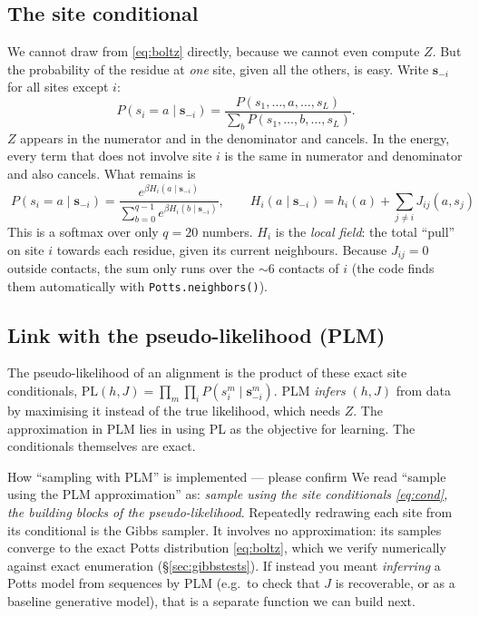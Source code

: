\documentclass[11pt,a4paper]{article}
\newcommand{\s}{\bm{s}}
\begin{document}
\subsection{The site conditional}
We cannot draw from \eqref{eq:boltz} directly, because we cannot even compute $Z$. But the probability
of the residue at \emph{one} site, given all the others, is easy. Write $\s_{-i}$ for all sites except $i$:
\[
P(s_i=a\mid\s_{-i}) = \frac{P(s_1,\dots,a,\dots,s_L)}{\sum_{b}P(s_1,\dots,b,\dots,s_L)}.
\]
$Z$ appears in the numerator and in the denominator and cancels. In the energy, every term that does
not involve site $i$ is the same in numerator and denominator and also cancels. What remains is
\begin{equation}\label{eq:cond}
\boxed{\;P(s_i=a\mid\s_{-i}) = \frac{e^{\beta H_i(a\mid\s_{-i})}}{\sum_{b=0}^{q-1} e^{\beta H_i(b\mid\s_{-i})}},\qquad
H_i(a\mid\s_{-i}) = h_i(a)+\sum_{j\neq i}J_{ij}(a,s_j)\;}
\end{equation}
This is a softmax over only $q=20$ numbers. $H_i$ is the \emph{local field}: the total ``pull'' on site
$i$ towards each residue, given its current neighbours. Because $J_{ij}=0$ outside contacts, the sum
only runs over the $\sim6$ contacts of $i$ (the code finds them automatically with
\texttt{Potts.neighbors()}).

\subsection{Link with the pseudo-likelihood (PLM)}
The pseudo-likelihood of an alignment is the product of these exact site conditionals,
$\mathrm{PL}(h,J)=\prod_{m}\prod_i P(s^m_i\mid\s^m_{-i})$. PLM \emph{infers} $(h,J)$ from data by
maximising it instead of the true likelihood, which needs $Z$. The approximation in PLM lies in
using PL as the objective for learning. The conditionals themselves are exact.

\begin{checkbox}{How ``sampling with PLM'' is implemented --- please confirm}
We read ``sample using the PLM approximation'' as: \emph{sample using the site conditionals
\eqref{eq:cond}, the building blocks of the pseudo-likelihood}. Repeatedly redrawing each site from
its conditional is the Gibbs sampler. It involves no approximation: its samples converge to the exact
Potts distribution \eqref{eq:boltz}, which we verify numerically against exact enumeration
(\S\ref{sec:gibbstests}). If instead you meant \emph{inferring} a Potts model from sequences by PLM
(e.g.\ to check that $J$ is recoverable, or as a baseline generative model), that is a separate
function we can build next.
\end{checkbox}
\end{document}
